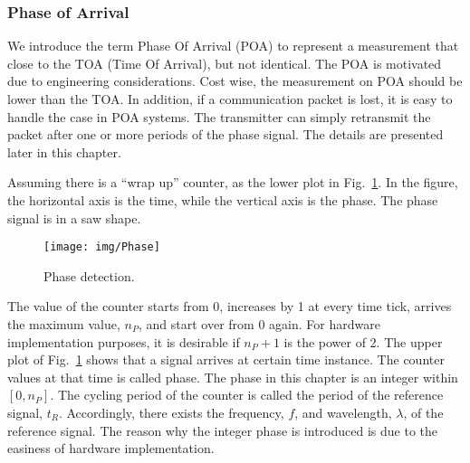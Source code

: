 \subsubsection{Phase of Arrival}
We introduce the term Phase Of Arrival (POA) to represent a measurement that close to the TOA (Time Of Arrival), but not identical. The POA is motivated due to engineering considerations. Cost wise, the measurement on POA should be lower than the TOA. In addition, if a communication packet is lost, it is easy to handle the case in POA systems. The transmitter can simply retransmit the packet after one or more periods of the phase signal. The details are presented later in this chapter.

Assuming there is a ``wrap up'' counter, as the lower plot in Fig.~\ref{f:phase}. In the figure, the horizontal axis is the time, while the vertical axis is the phase. The phase signal is in a saw shape.
\begin{figure}
  \centering
  \texttt{[image: img/Phase]}\\
  \caption{Phase detection.}\label{f:phase}
\end{figure}
    The value of the counter starts from 0, increases by 1 at every time tick, arrives the maximum value, $n_P$, and start over from 0 again. For hardware implementation purposes, it is desirable if $n_P +1$ is the power of 2. The upper plot of Fig.~\ref{f:phase} shows that a signal arrives at certain time instance. The counter values at that time is called phase. The phase in this chapter is an integer within $[0, n_P]$. The cycling period of the counter is called the period of the reference signal, $t_R$. Accordingly, there exists the frequency, $f$, and wavelength, $\lambda$, of the reference signal.
        The reason why the integer phase is introduced is due to the easiness of hardware implementation.

